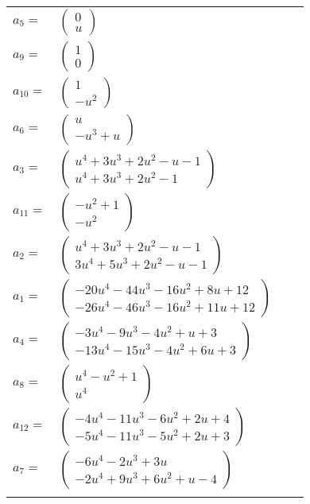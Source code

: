 \documentclass[1p]{elsarticle_modified}
\theoremstyle{definition}
\begin{document}
\begin{tabular}{m{7pt} m{180pt} m{7pt} m{180pt} }
\flushright $a_{5}=$&$\begin{pmatrix}0\\u\end{pmatrix}$ \\
\flushright $a_{9}=$&$\begin{pmatrix}1\\0\end{pmatrix}$ \\
\flushright $a_{10}=$&$\begin{pmatrix}1\\- u^2\end{pmatrix}$ \\
\flushright $a_{6}=$&$\begin{pmatrix}u\\- u^3+u\end{pmatrix}$ \\
\flushright $a_{3}=$&$\begin{pmatrix}u^4+3 u^3+2 u^2- u-1\\u^4+3 u^3+2 u^2-1\end{pmatrix}$ \\
\flushright $a_{11}=$&$\begin{pmatrix}- u^2+1\\- u^2\end{pmatrix}$ \\
\flushright $a_{2}=$&$\begin{pmatrix}u^4+3 u^3+2 u^2- u-1\\3 u^4+5 u^3+2 u^2- u-1\end{pmatrix}$ \\
\flushright $a_{1}=$&$\begin{pmatrix}-20 u^4-44 u^3-16 u^2+8 u+12\\-26 u^4-46 u^3-16 u^2+11 u+12\end{pmatrix}$ \\
\flushright $a_{4}=$&$\begin{pmatrix}-3 u^4-9 u^3-4 u^2+u+3\\-13 u^4-15 u^3-4 u^2+6 u+3\end{pmatrix}$ \\
\flushright $a_{8}=$&$\begin{pmatrix}u^4- u^2+1\\u^4\end{pmatrix}$ \\
\flushright $a_{12}=$&$\begin{pmatrix}-4 u^4-11 u^3-6 u^2+2 u+4\\-5 u^4-11 u^3-5 u^2+2 u+3\end{pmatrix}$ \\
\flushright $a_{7}=$&$\begin{pmatrix}-6 u^4-2 u^3+3 u\\-2 u^4+9 u^3+6 u^2+u-4\end{pmatrix}$\\&\end{tabular}
\end{document}
